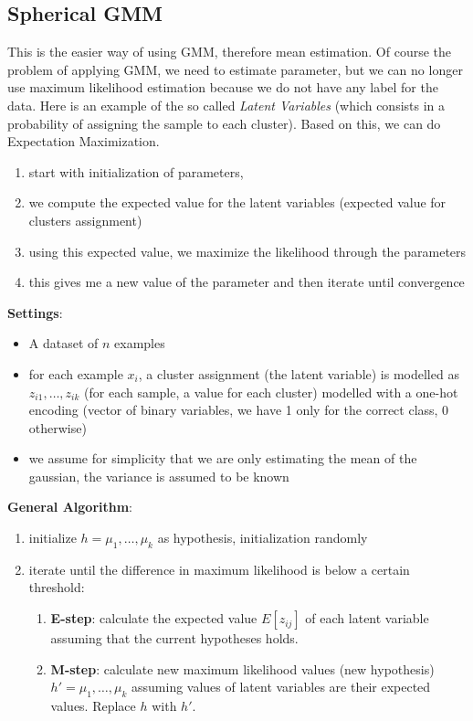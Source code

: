 \subsection{Spherical GMM}
This is the easier way of using GMM, therefore mean estimation. Of course the problem
of applying GMM, we need to estimate parameter, but we can no longer use maximum
likelihood estimation because we do not have any label for the data. Here is an
example of the so called \textit{Latent Variables} (which consists in a
probability of assigning the sample to each cluster). Based on this, we can do Expectation
Maximization.
\begin{enumerate}
	\item start with initialization of parameters,

	\item we compute the expected value for the latent variables (expected value
		for clusters assignment)

	\item using this expected value, we maximize the likelihood through the
		parameters

	\item this gives me a new value of the parameter and then iterate until convergence
\end{enumerate}

\textbf{Settings}:
\begin{itemize}
	\item A dataset of $n$ examples

	\item for each example $x_{i}$, a cluster assignment (the latent variable) is
		modelled as $z_{i1}, \dots, z_{ik}$ (for each sample, a value for each
		cluster) modelled with a one-hot encoding (vector of binary variables, we have
		1 only for the correct class, 0 otherwise)

	\item we assume for simplicity that we are only estimating the mean of the gaussian,
		the variance is assumed to be known
\end{itemize}

\textbf{General Algorithm}:
\begin{enumerate}
	\item initialize $h ={\mu_1, \dots, \mu_k}$ as hypothesis, initialization
		randomly

	\item iterate until the difference in maximum likelihood is below a certain threshold:
		\begin{enumerate}
			\item \textbf{E-step}: calculate the expected value $E[z_{ij}]$ of each latent
				variable assuming that the current hypotheses holds.

			\item \textbf{M-step}: calculate new maximum likelihood values (new
				hypothesis) $h' ={\mu_1, \dots, \mu_k}$ assuming values of latent variables
				are their expected values. Replace $h$ with $h'$.
		\end{enumerate}
\end{enumerate}

